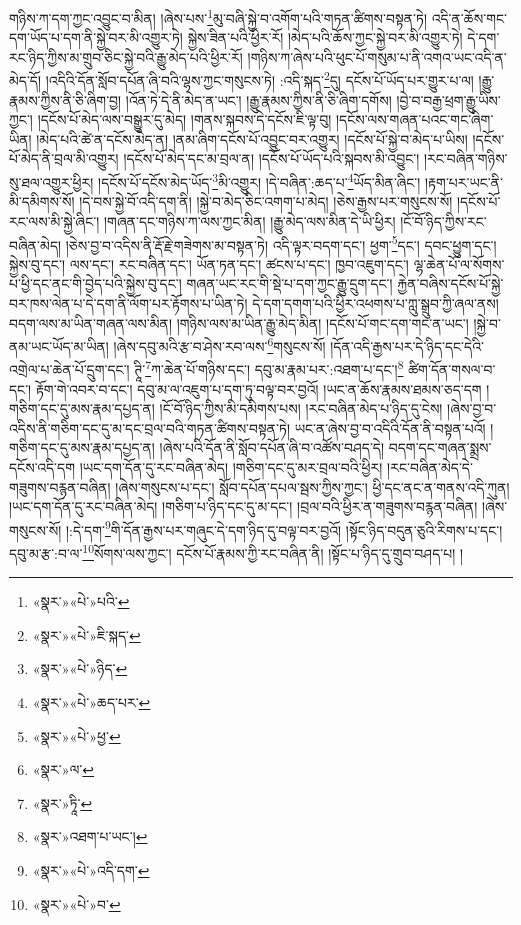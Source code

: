གཉིས་ཀ་དག་ཀྱང་འབྱུང་བ་མིན། །ཞེས་པས་\footnote{«སྣར་»«པེ་»པའི་}མུ་བཞི་སྐྱེ་བ་འགོག་པའི་གཏན་ཚིགས་བསྟན་ཏེ། འདི་ན་ཆོས་གང་དག་ཡོད་པ་དག་ནི་སྐྱེ་བར་མི་འགྱུར་ཏེ། སྐྱེས་ཟིན་པའི་ཕྱིར་རོ། །མེད་པའི་ཆོས་ཀྱང་སྐྱེ་བར་མི་འགྱུར་ཏེ། དེ་དག་རང་ཉིད་ཀྱིས་མ་གྲུབ་ཅིང་སྐྱེ་བའི་རྒྱུ་མེད་པའི་ཕྱིར་རོ། །གཉིས་ཀ་ཞེས་པའི་ཕུང་པོ་གསུམ་པ་ནི་འགའ་ཡང་འདི་ན་མེད་དོ། །འདིའི་དོན་སློབ་དཔོན་ཞི་བའི་ལྷས་ཀྱང་གསུངས་ཏེ། :འདི་སྐད་\footnote{«སྣར་»«པེ་»ཇི་སྐད་}དུ། དངོས་པོ་ཡོད་པར་གྱུར་པ་ལ། །རྒྱུ་རྣམས་ཀྱིས་ནི་ཅི་ཞིག་བྱ། །འོན་ཏེ་དེ་ནི་མེད་ན་ཡང་། །རྒྱུ་རྣམས་ཀྱིས་ནི་ཅི་ཞིག་དགོས། །བྱེ་བ་བརྒྱ་ཕྲག་རྒྱུ་ཡིས་ཀྱང་། །དངོས་པོ་མེད་ལས་བསྒྱུར་དུ་མེད། །གནས་སྐབས་དེ་དངོས་ཇི་ལྟ་བུ། །དངོས་ལས་གཞན་པའང་གང་ཞིག་ཡིན། །མེད་པའི་ཚེ་ན་དངོས་མེད་ན། །ནམ་ཞིག་དངོས་པོ་འབྱུང་བར་འགྱུར། །དངོས་པོ་སྐྱེ་བ་མེད་པ་ཡིས། །དངོས་པོ་མེད་ནི་བྲལ་མི་འགྱུར། །དངོས་པོ་མེད་དང་མ་བྲལ་ན། །དངོས་པོ་ཡོད་པའི་སྐབས་མི་འབྱུང་། །རང་བཞིན་གཉིས་སུ་ཐལ་འགྱུར་ཕྱིར། །དངོས་པོ་དངོས་མེད་ཡོད་\footnote{«སྣར་»«པེ་»ཉིད་}མི་འགྱུར། །དེ་བཞིན་:ཆད་པ་\footnote{«སྣར་»«པེ་»ཆད་པར་}ཡོད་མིན་ཞིང་། །རྟག་པར་ཡང་ནི་མི་དམིགས་སོ། །དེ་བས་སྐྱེ་བོ་འདི་དག་ནི། །སྐྱེ་བ་མེད་ཅིང་འགག་པ་མེད། །ཅེས་རྒྱས་པར་གསུངས་སོ། །དངོས་པོ་རང་ལས་མི་སྐྱེ་ཞིང་། །གཞན་དང་གཉིས་ཀ་ལས་ཀྱང་མིན། །རྒྱུ་མེད་ལས་མིན་དེ་ཡི་ཕྱིར། །ངོ་བོ་ཉིད་ཀྱིས་རང་བཞིན་མེད། །ཅེས་བྱ་བ་འདིས་ནི་རྡོ་རྗེ་གཟེགས་མ་བསྟན་ཏེ། འདི་ལྟར་བདག་དང་། ཕྱག་\footnote{«སྣར་»«པེ་»ཕྱ་}དང་། དབང་ཕྱུག་དང་། སྐྱེས་བུ་དང་། ལས་དང་། རང་བཞིན་དང་། ཡོན་ཏན་དང་། ཚངས་པ་དང་། ཁྱབ་འཇུག་དང་། ལྷ་ཆེན་པོ་ལ་སོགས་པ་ཕྱི་དང་ནང་གི་བྱེད་པའི་སྐྱེས་བུ་དང་། གཞན་ཡང་རང་གི་སྡེ་པ་དག་ཀྱང་རྒྱུ་དྲུག་དང་། རྐྱེན་བཞིས་དངོས་པོ་སྐྱེ་བར་ཁས་ལེན་པ་དེ་དག་ནི་ལོག་པར་རྟོགས་པ་ཡིན་ཏེ། དེ་དག་དགག་པའི་ཕྱིར་འཕགས་པ་ཀླུ་སྒྲུབ་ཀྱི་ཞལ་ནས། བདག་ལས་མ་ཡིན་གཞན་ལས་མིན། །གཉིས་ལས་མ་ཡིན་རྒྱུ་མེད་མིན། །དངོས་པོ་གང་དག་གང་ན་ཡང་། །སྐྱེ་བ་ནམ་ཡང་ཡོད་མ་ཡིན། །ཞེས་དབུ་མའི་རྩ་བ་ཤེས་རབ་ལས་\footnote{«སྣར་»ལ་}གསུངས་སོ། །དོན་འདི་རྒྱས་པར་དེ་ཉིད་དང་དེའི་འགྲེལ་པ་ཆེན་པོ་དྲུག་དང་། ཊཱི་\footnote{«སྣར་»ཏཱི་}ཀ་ཆེན་པོ་གཉིས་དང་། དབུ་མ་རྣམ་པར་:འཐག་པ་དང་།\footnote{«སྣར་»འཐག་པ་ཡང་།} ཚིག་དོན་གསལ་བ་དང་། རྟོག་གེ་འབར་བ་དང་། དབུ་མ་ལ་འཇུག་པ་དག་ཏུ་བལྟ་བར་བྱའོ། །ཡང་ན་ཆོས་རྣམས་ཐམས་ཅད་དག །གཅིག་དང་དུ་མས་རྣམ་དཔྱད་ན། །ངོ་བོ་ཉིད་ཀྱིས་མི་དམིགས་པས། །རང་བཞིན་མེད་པ་ཉིད་དུ་ངེས། །ཞེས་བྱ་བ་འདིས་ནི་གཅིག་དང་དུ་མ་དང་བྲལ་བའི་གཏན་ཚིགས་བསྟན་ཏེ། ཡང་ན་ཞེས་བྱ་བ་འདིའི་དོན་ནི་བསྟན་པའོ། །གཅིག་དང་དུ་མས་རྣམ་དཔྱད་ན། །ཞེས་པའི་དོན་ནི་སློབ་དཔོན་ཞི་བ་འཚོས་བཤད་དེ། བདག་དང་གཞན་སྨྲས་དངོས་འདི་དག །ཡང་དག་དོན་དུ་རང་བཞིན་མེད། །གཅིག་དང་དུ་མར་བྲལ་བའི་ཕྱིར། །རང་བཞིན་མེད་དེ་གཟུགས་བརྙན་བཞིན། །ཞེས་གསུངས་པ་དང་། སློབ་དཔོན་དཔལ་སྦས་ཀྱིས་ཀྱང་། ཕྱི་དང་ནང་ན་གནས་འདི་ཀུན། །ཡང་དག་དོན་དུ་རང་བཞིན་མེད། །གཅིག་པ་ཉིད་དང་དུ་མ་དང་། །བྲལ་བའི་ཕྱིར་ན་གཟུགས་བརྙན་བཞིན། །ཞེས་གསུངས་སོ། །:དེ་དག་\footnote{«སྣར་»«པེ་»འདི་དག་}གི་དོན་རྒྱས་པར་གཞུང་དེ་དག་ཉིད་དུ་བལྟ་བར་བྱའོ། །སྟོང་ཉིད་བདུན་ཅུའི་རིགས་པ་དང་། དབུ་མ་རྩ་:བ་ལ་\footnote{«སྣར་»«པེ་»བ་}སོགས་ལས་ཀྱང་། དངོས་པོ་རྣམས་ཀྱི་རང་བཞིན་ནི། །སྟོང་པ་ཉིད་དུ་གྲུབ་བཤད་པ། །

